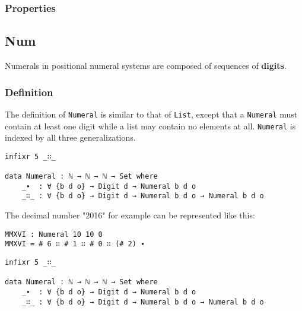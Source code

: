 \documentclass[12pt, a4paper]{article}
\begin{document}
\subsubsection{Properties}

%
%

\subsection{Num}

Numerals in positional numeral systems are composed of sequences of \textbf{digits}.

\subsubsection{Definition}
The definition of {\lstinline|Numeral|} is similar to that of {\lstinline|List|},
except that a {\lstinline|Numeral|} must contain at least one digit while a list
may contain no elements at all. {\lstinline|Numeral|} is indexed by all three
generalizations.

\begin{lstlisting}
infixr 5 _∷_

data Numeral : ℕ → ℕ → ℕ → Set where
    _∙  : ∀ {b d o} → Digit d → Numeral b d o
    _∷_ : ∀ {b d o} → Digit d → Numeral b d o → Numeral b d o
\end{lstlisting}

The decimal number "2016" for example can be represented like this:

\begin{lstlisting}
MMXVI : Numeral 10 10 0
MMXVI = # 6 ∷ # 1 ∷ # 0 ∷ (# 2) ∙
\end{lstlisting}



\begin{lstlisting}
infixr 5 _∷_

data Numeral : ℕ → ℕ → ℕ → Set where
    _∙  : ∀ {b d o} → Digit d → Numeral b d o
    _∷_ : ∀ {b d o} → Digit d → Numeral b d o → Numeral b d o
\end{lstlisting}
\end{document}
